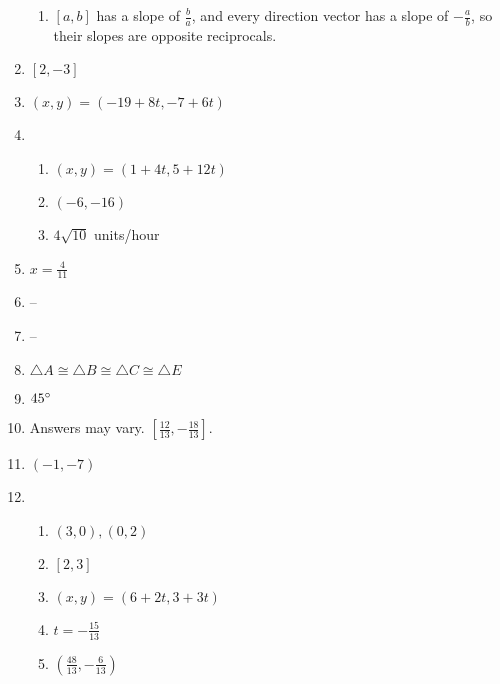 \documentclass{article}
\begin{document}
\begin{enumerate}
\begin{enumerate}
	\item $[a, b]$ has a slope of $\frac{b}{a}$, and every direction vector has a slope of $-\frac{a}{b}$, so their slopes are opposite reciprocals.
	
	\end{enumerate}
	
\item $[2,-3]$

\item $(x, y) = (-19 + 8t, -7 + 6t)$

\item

	\begin{enumerate}
	
	\item $(x, y) = (1 + 4t, 5 + 12t)$
	
	\item $(-6, -16)$
	
	\item $4\sqrt{10}$ units/hour
	
	\end{enumerate}
	
\item $x = \frac{4}{11}$

\item --

\item --

\item $\triangle A \cong \triangle B \cong \triangle C \cong \triangle E$

\item $45 \degree$

\item Answers may vary. $[\frac{12}{13}, -\frac{18}{13}]$.

\item $(-1, -7)$

\item

	\begin{enumerate}
	
	\item $(3, 0), (0,2)$
	
	\item $[2, 3]$
	
	\item $(x, y) = (6 + 2t, 3 + 3t)$
	
	\item $t = -\frac{15}{13}$
	
	\item $(\frac{48}{13}, -\frac{6}{13})$
	

\end{enumerate}
\end{enumerate}
\end{document}
